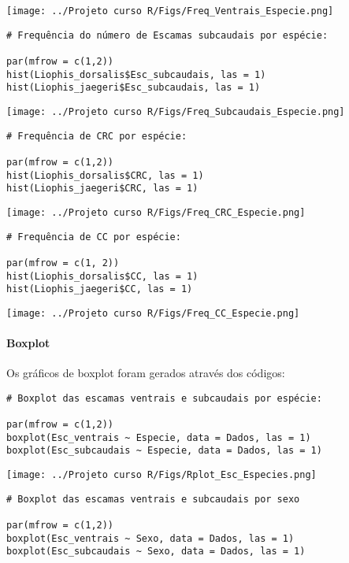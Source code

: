 \documentclass[
]{article}
\begin{document}
\texttt{[image: ../Projeto curso R/Figs/Freq\_Ventrais\_Especie.png]}

\begin{verbatim}
# Frequência do número de Escamas subcaudais por espécie:

par(mfrow = c(1,2))
hist(Liophis_dorsalis$Esc_subcaudais, las = 1)
hist(Liophis_jaegeri$Esc_subcaudais, las = 1)
\end{verbatim}

\texttt{[image: ../Projeto curso R/Figs/Freq\_Subcaudais\_Especie.png]}

\begin{verbatim}
# Frequência de CRC por espécie:

par(mfrow = c(1,2))
hist(Liophis_dorsalis$CRC, las = 1)
hist(Liophis_jaegeri$CRC, las = 1)
\end{verbatim}

\texttt{[image: ../Projeto curso R/Figs/Freq\_CRC\_Especie.png]}

\begin{verbatim}
# Frequência de CC por espécie:

par(mfrow = c(1, 2))
hist(Liophis_dorsalis$CC, las = 1)
hist(Liophis_jaegeri$CC, las = 1)
\end{verbatim}

\texttt{[image: ../Projeto curso R/Figs/Freq\_CC\_Especie.png]}

\hypertarget{boxplot}{%
\paragraph{Boxplot}\label{boxplot}}

Os gráficos de boxplot foram gerados através dos códigos:

\begin{verbatim}
# Boxplot das escamas ventrais e subcaudais por espécie:

par(mfrow = c(1,2))
boxplot(Esc_ventrais ~ Especie, data = Dados, las = 1)
boxplot(Esc_subcaudais ~ Especie, data = Dados, las = 1)
\end{verbatim}

\texttt{[image: ../Projeto curso R/Figs/Rplot\_Esc\_Especies.png]}

\begin{verbatim}
# Boxplot das escamas ventrais e subcaudais por sexo

par(mfrow = c(1,2))
boxplot(Esc_ventrais ~ Sexo, data = Dados, las = 1)
boxplot(Esc_subcaudais ~ Sexo, data = Dados, las = 1)
\end{verbatim}
\end{document}
